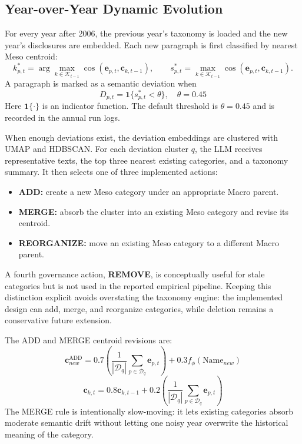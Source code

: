\documentclass[11pt, a4paper]{article}
\begin{document}
\subsection{Year-over-Year Dynamic Evolution}
For every year after 2006, the previous year's taxonomy is loaded and the new year's disclosures are embedded. Each new paragraph is first classified by nearest Meso centroid:
\begin{equation}
k^{*}_{p,t}=\arg\max_{k\in\mathcal{K}_{t-1}}\cos(\mathbf{e}_{p,t},\mathbf{c}_{k,t-1}),
\qquad
s^{*}_{p,t}=\max_{k\in\mathcal{K}_{t-1}}\cos(\mathbf{e}_{p,t},\mathbf{c}_{k,t-1}).
\end{equation}
A paragraph is marked as a semantic deviation when
\begin{equation}
D_{p,t} = \mathbf{1}\{s_{p,t}^{*} < \theta\}, \quad \theta=0.45
\end{equation}
Here $\mathbf{1}\{\cdot\}$ is an indicator function. The default threshold is $\theta=0.45$ and is recorded in the annual run logs.

When enough deviations exist, the deviation embeddings are clustered with UMAP and HDBSCAN. For each deviation cluster $q$, the LLM receives representative texts, the top three nearest existing categories, and a taxonomy summary. It then selects one of three implemented actions:
\begin{itemize}
    \item \textbf{ADD:} create a new Meso category under an appropriate Macro parent.
    \item \textbf{MERGE:} absorb the cluster into an existing Meso category and revise its centroid.
    \item \textbf{REORGANIZE:} move an existing Meso category to a different Macro parent.
\end{itemize}
A fourth governance action, \textbf{REMOVE}, is conceptually useful for stale categories but is not used in the reported empirical pipeline. Keeping this distinction explicit avoids overstating the taxonomy engine: the implemented design can add, merge, and reorganize categories, while deletion remains a conservative future extension.

The ADD and MERGE centroid revisions are:
\begin{equation}
\mathbf{c}_{new}^{\text{ADD}} = 0.7\left(\frac{1}{|\mathcal{D}_{q}|}\sum_{p\in\mathcal{D}_{q}}\mathbf{e}_{p,t}\right) + 0.3 f_{\phi}(\text{Name}_{new})
\end{equation}
\begin{equation}
\mathbf{c}_{k,t} = 0.8\mathbf{c}_{k,t-1} + 0.2\left(\frac{1}{|\mathcal{D}_{q}|}\sum_{p\in\mathcal{D}_{q}}\mathbf{e}_{p,t}\right)
\end{equation}
The MERGE rule is intentionally slow-moving: it lets existing categories absorb moderate semantic drift without letting one noisy year overwrite the historical meaning of the category.
\end{document}
